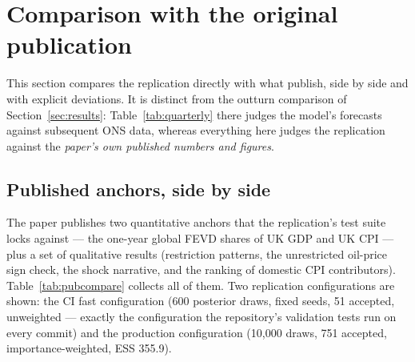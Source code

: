 \section{Comparison with the original publication}
\label{sec:comparison}

This section compares the replication directly with what \citet{brignone2025} publish, side by side and with explicit deviations. It is distinct from the outturn comparison of Section~\ref{sec:results}: Table~\ref{tab:quarterly} there judges the model's forecasts against subsequent ONS data, whereas everything here judges the replication against the \emph{paper's own published numbers and figures}.

\subsection{Published anchors, side by side}
\label{sec:comparison-table}

The paper publishes two quantitative anchors that the replication's test suite locks against --- the one-year global FEVD shares of UK GDP and UK CPI --- plus a set of qualitative results (restriction patterns, the unrestricted oil-price sign check, the shock narrative, and the ranking of domestic CPI contributors). Table~\ref{tab:pubcompare} collects all of them. Two replication configurations are shown: the CI fast configuration (600 posterior draws, fixed seeds, 51 accepted, unweighted --- exactly the configuration the repository's validation tests run on every commit) and the production configuration (10{,}000 draws, 751 accepted, importance-weighted, ESS 355.9).

